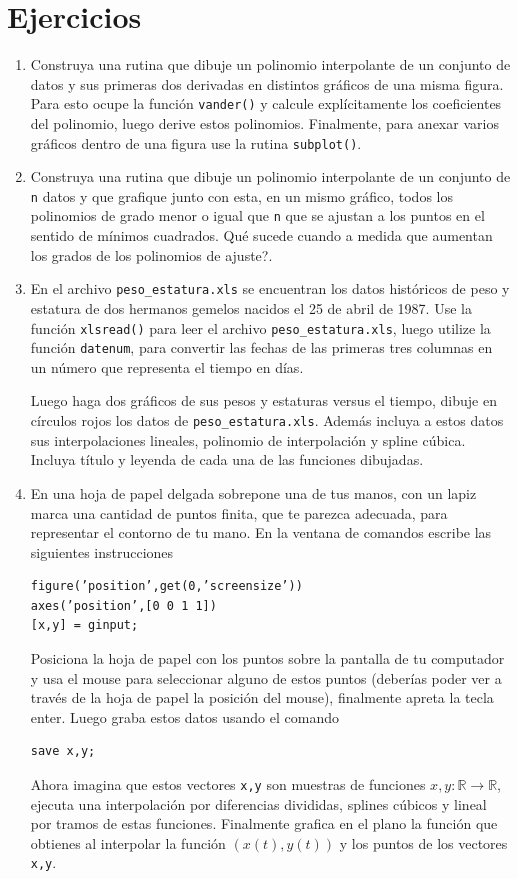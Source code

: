 \documentclass[11pt]{article}
\begin{document}
\section{Ejercicios}
\begin{enumerate}


\item Construya una rutina que dibuje un polinomio interpolante de un conjunto de datos y sus primeras dos derivadas en distintos gr\'aficos de una misma figura. Para esto ocupe la funci\'on \texttt{vander()} y calcule expl\'icitamente los coeficientes del polinomio, luego derive estos polinomios. Finalmente, para anexar varios gr\'aficos dentro de una figura use la rutina \texttt{subplot()}.

\item Construya una rutina que dibuje un polinomio interpolante de un conjunto de \texttt{n} datos y que grafique junto con esta, en un mismo gr\'afico, todos los polinomios de grado menor o igual que \texttt{n} que se ajustan a los puntos en el sentido de m\'inimos cuadrados. \textquestiondown Qu\'e sucede cuando a medida que aumentan los grados de los polinomios de ajuste?.


\item En el archivo \texttt{peso\_estatura.xls} se encuentran los datos hist\'oricos de peso y estatura de dos hermanos gemelos nacidos el 25 de abril de 1987. Use la funci\'on \texttt{xlsread()} para leer el archivo \texttt{peso\_estatura.xls}, luego utilize la funci\'on \texttt{datenum}, para convertir las fechas de las primeras tres columnas en un n\'umero que representa el tiempo en d\'ias.

Luego haga dos gr\'aficos de sus pesos y estaturas versus el tiempo, dibuje en c\'irculos rojos los datos de \texttt{peso\_estatura.xls}. Adem\'as incluya a estos datos sus interpolaciones lineales, polinomio de interpolaci\'on y spline c\'ubica. Incluya t\'itulo y leyenda de cada una de las funciones dibujadas.

\item En una hoja de papel delgada sobrepone una de tus manos, con un lapiz marca una cantidad de puntos finita,  que te parezca adecuada, para representar el contorno de tu mano. En la ventana de comandos escribe las siguientes instrucciones
\begin{verbatim}
figure(’position’,get(0,’screensize’))
axes(’position’,[0 0 1 1])
[x,y] = ginput;
\end{verbatim}
Posiciona la hoja de papel con los puntos sobre la pantalla de tu computador y usa el mouse para seleccionar alguno de estos puntos (deberías poder ver a trav\'es de la hoja de papel la posici\'on del mouse), finalmente apreta la tecla enter. Luego graba estos datos usando el comando 
\begin{verbatim}
save x,y;
\end{verbatim}
Ahora imagina que estos vectores \texttt{x,y} son muestras de funciones $x,y:\mathbb{R}\rightarrow \mathbb{R}$, ejecuta una interpolaci\'on por diferencias divididas, splines c\'ubicos y lineal por tramos de estas funciones. Finalmente grafica en el plano la funci\'on que obtienes al interpolar la funci\'on $(x(t),y(t))$ y los puntos de los vectores \texttt{x,y}.


\end{enumerate}
\end{document}
